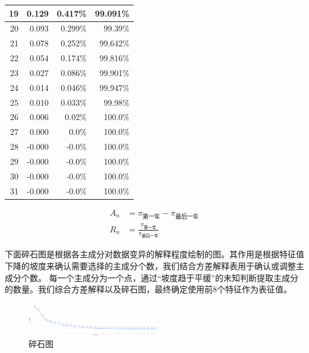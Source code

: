 \documentclass[UTF8]{ctexart}
\begin{document}
\begin{table}[!ht]
\begin{tabular}{|r|r|r|r|}
		19     & 0.129      & 0.417\%  & 99.091\% \\ \hline
		20     & 0.093      & 0.299\%  & 99.39\%  \\ \hline
		21     & 0.078      & 0.252\%  & 99.642\% \\ \hline
		22     & 0.054      & 0.174\%  & 99.816\% \\ \hline
		23     & 0.027      & 0.086\%  & 99.901\% \\ \hline
		24     & 0.014      & 0.046\%  & 99.947\% \\ \hline
		25     & 0.010      & 0.033\%  & 99.98\%  \\ \hline
		26     & 0.006      & 0.02\%   & 100.0\%  \\ \hline
		27     & 0.000      & 0.0\%    & 100.0\%  \\ \hline
		28     & -0.000     & -0.0\%   & 100.0\%  \\ \hline
		29     & -0.000     & -0.0\%   & 100.0\%  \\ \hline
		30     & -0.000     & -0.0\%   & 100.0\%  \\ \hline
		31     & -0.000     & -0.0\%   & 100.0\%  \\ \hline
	\end{tabular}
\end{table}

\begin{equation}
	\begin{aligned}
		A_n & =\pi_{\mbox{第一年}} - \pi_{\mbox{最后一年}}       \\
		R_n & =\frac{\pi_{\mbox{第一年}}}{\pi_{\mbox{最后一年}}}
	\end{aligned}
\end{equation}


下面碎石图是根据各主成分对数据变异的解释程度绘制的图。其作用是根据特征值下降的坡度来确认需要选择的主成分个数，我们结合方差解释表用于确认或调整主成分个数。 每一个主成分为一个点，通过“坡度趋于平缓”的未知判断提取主成分的数量。我们综合方差解释以及碎石图，最终确定使用前8个特征作为表征值。

\begin{figure}[H]\centering

	\includegraphics[width=0.52\textwidth,height=0.45\textwidth]{img/4/solid.png} %
	\caption{碎石图} %
	\label{fig:figure 5} %
\end{figure}
\end{document}
